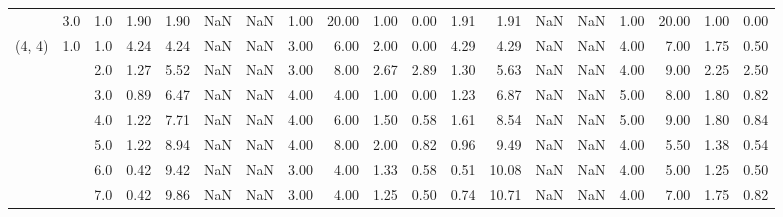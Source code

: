 \begin{tabular}{lllrrrrrrrrrrrrrrrr}
       & 3.0 & 1.0  &      1.90 &       1.90 &               NaN &                NaN & 1.00 &  20.00 &             1.00 &                         0.00 &      1.91 &       1.91 &               NaN &                NaN & 1.00 &  20.00 &             1.00 &                         0.00 \\
(4, 4) & 1.0 & 1.0  &      4.24 &       4.24 &               NaN &                NaN & 3.00 &   6.00 &             2.00 &                         0.00 &      4.29 &       4.29 &               NaN &                NaN & 4.00 &   7.00 &             1.75 &                         0.50 \\
       &     & 2.0  &      1.27 &       5.52 &               NaN &                NaN & 3.00 &   8.00 &             2.67 &                         2.89 &      1.30 &       5.63 &               NaN &                NaN & 4.00 &   9.00 &             2.25 &                         2.50 \\
       &     & 3.0  &      0.89 &       6.47 &               NaN &                NaN & 4.00 &   4.00 &             1.00 &                         0.00 &      1.23 &       6.87 &               NaN &                NaN & 5.00 &   8.00 &             1.80 &                         0.82 \\
       &     & 4.0  &      1.22 &       7.71 &               NaN &                NaN & 4.00 &   6.00 &             1.50 &                         0.58 &      1.61 &       8.54 &               NaN &                NaN & 5.00 &   9.00 &             1.80 &                         0.84 \\
       &     & 5.0  &      1.22 &       8.94 &               NaN &                NaN & 4.00 &   8.00 &             2.00 &                         0.82 &      0.96 &       9.49 &               NaN &                NaN & 4.00 &   5.50 &             1.38 &                         0.54 \\
       &     & 6.0  &      0.42 &       9.42 &               NaN &                NaN & 3.00 &   4.00 &             1.33 &                         0.58 &      0.51 &      10.08 &               NaN &                NaN & 4.00 &   5.00 &             1.25 &                         0.50 \\
       &     & 7.0  &      0.42 &       9.86 &               NaN &                NaN & 3.00 &   4.00 &             1.25 &                         0.50 &      0.74 &      10.71 &               NaN &                NaN & 4.00 &   7.00 &             1.75 &                         0.82 \\

\end{tabular}
